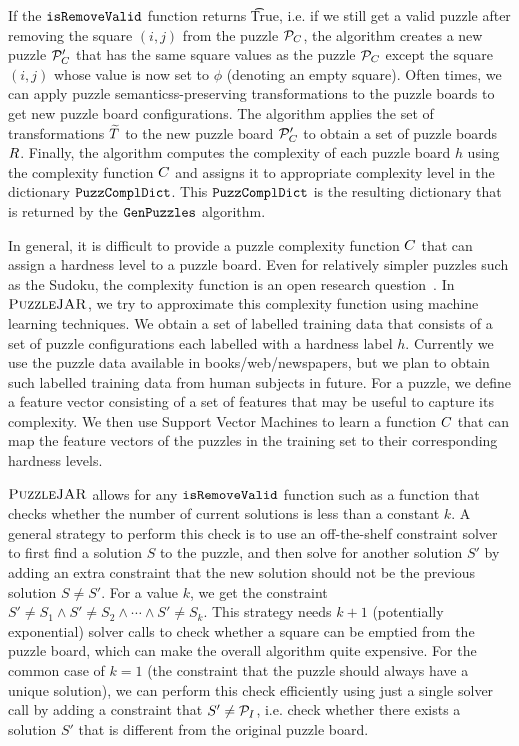 If the $\texttt{isRemoveValid}$ function returns \t{True}, i.e. if we still
get a valid puzzle after removing the square $(i,j)$ from the puzzle
$\mathcal{P}_C$, the algorithm creates a new puzzle $\mathcal{P}_C'$
that has the same square values as the puzzle $\mathcal{P}_C$ except
the square $(i,j)$ whose value is now set to $\phi$ (denoting an empty
square). Often times, we can apply puzzle semanticss-preserving
transformations to the puzzle boards to get new puzzle board
configurations. The algorithm applies the set of transformations
$\widetilde{T}$ to the new puzzle board $\mathcal{P}_C'$ to
obtain a set of puzzle boards $R$. Finally, the algorithm
computes the complexity of each puzzle board $h$ using the complexity
function $C$ and assigns it to appropriate complexity
level in the dictionary $\texttt{PuzzComplDict}$. This $\texttt{PuzzComplDict}$ is
the resulting dictionary that is returned by the $\texttt{GenPuzzles}$
algorithm.

In general, it is difficult to provide a puzzle complexity function
$C$ that can assign a hardness level to a puzzle
board. Even for relatively simpler puzzles such as the Sudoku, the
complexity function is an open research
question~\cite{sudokuchaos}. In $\textsc{PuzzleJAR}$, we try to approximate
this complexity function using machine learning techniques. We obtain
a set of labelled training data that consists of a set of puzzle
configurations each labelled with a hardness label $h$. Currently we
use the puzzle data available in books/web/newspapers, but we plan to
obtain such labelled training data from human subjects in future. For
a puzzle, we define a feature vector consisting of a set of features
that may be useful to capture its complexity. We then use Support
Vector Machines to learn a function $C$ that can map
the feature vectors of the puzzles in the training set to their
corresponding hardness levels.

$\textsc{PuzzleJAR}$ allows for any $\texttt{isRemoveValid}$ function such as a
function that checks whether the number of current solutions is less
than a constant $k$. A general strategy to perform this check is to
use an off-the-shelf constraint solver to first find a solution $S$ to
the puzzle, and then solve for another solution $S'$ by adding an
extra constraint that the new solution should not be the previous
solution $S \neq S'$. For a value $k$, we get the constraint $S' \neq
S_1 \land S' \neq S_2 \land \cdots \land S' \neq S_k$. This strategy
needs $k+1$ (potentially exponential) solver calls to check whether a
square can be emptied from the puzzle board, which can make the
overall algorithm quite expensive. For the common case of $k=1$ (the
constraint that the puzzle should always have a unique solution), we
can perform this check efficiently using just a single solver call by
adding a constraint that $S' \neq \mathcal{P}_I$, i.e. check whether
there exists a solution $S'$ that is different from the original
puzzle board.
